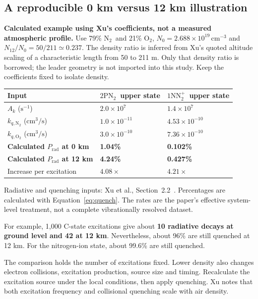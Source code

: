 \documentclass[11pt,a4paper]{article}
\newcommand{\Ntwo}{\ensuremath{\mathrm{N}_2}}
\newcommand{\Otwo}{\ensuremath{\mathrm{O}_2}}
\newcommand{\TwoP}{\ensuremath{2\mathrm{P}\mathrm{N}_2}}
\newcommand{\OneN}{\ensuremath{1\mathrm{N}\mathrm{N}_2^{+}}}
\newcommand{\xu}[1]{\cite[#1]{Xu2015}}
\newcommand{\source}[1]{{\small\color{muted}#1}\par}
\begin{document}
\subsection*{A reproducible 0 km versus 12 km illustration}
\textbf{Calculated example using Xu's coefficients, not a measured atmospheric profile.} Use 79\% \Ntwo\ and 21\% \Otwo, $N_0=2.688\times10^{19}\,\mathrm{cm}^{-3}$ and $N_{12}/N_0=50/211\simeq0.237$. The density ratio is inferred from Xu's quoted altitude scaling of a characteristic length from 50 to 211 m. Only that density ratio is borrowed; the leader geometry is not imported into this study. Keep the coefficients fixed to isolate density.\xu{Secs.~2.2 and 4.2}

\begin{center}
\small
\begin{tabularx}{\textwidth}{@{}Y P{33mm}P{36mm}@{}}
\toprule
\textbf{Input} & \textbf{\TwoP\ upper state} & \textbf{\OneN\ upper state}\\
\midrule
$A_k$ ($\mathrm{s}^{-1}$) & $2.0\times10^7$ & $1.4\times10^7$\\
$k_{q,\mathrm{N}_2}$ ($\mathrm{cm^3/s}$) & $1.0\times10^{-11}$ & $4.53\times10^{-10}$\\
$k_{q,\mathrm{O}_2}$ ($\mathrm{cm^3/s}$) & $3.0\times10^{-10}$ & $7.36\times10^{-10}$\\
\midrule
\textbf{Calculated $P_{\mathrm{rad}}$ at 0 km} & \textbf{1.04\%} & \textbf{0.102\%}\\
\textbf{Calculated $P_{\mathrm{rad}}$ at 12 km} & \textbf{4.24\%} & \textbf{0.427\%}\\
Increase per excitation & $4.08\times$ & $4.21\times$\\
\bottomrule
\end{tabularx}
\end{center}
\source{Radiative and quenching inputs: Xu et al., Section~2.2~\cite{Xu2015}. Percentages are calculated with Equation~\eqref{eq:quench}. The rates are the paper's effective system-level treatment, not a complete vibrationally resolved dataset.}

For example, 1,000 C-state excitations give about \textbf{10 radiative decays at ground level and 42 at 12 km}. Nevertheless, about 96\% are still quenched at 12 km. For the nitrogen-ion state, about 99.6\% are still quenched.

\begin{keybox}
The comparison holds the number of excitations fixed. Lower density also changes electron collisions, excitation production, source size and timing. Recalculate the excitation source under the local conditions, then apply quenching. Xu notes that both excitation frequency and collisional quenching scale with air density.\xu{Sec.~4.2}
\end{keybox}
\end{document}
